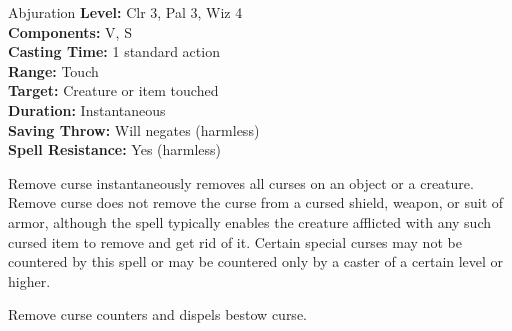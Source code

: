 {Abjuration}
{
	\textbf{Level:}
	Clr 3, Pal 3, Wiz 4\\
	\textbf{Components:}
	V, S\\
	\textbf{Casting Time:}
	1 standard action\\
	\textbf{Range:}
	Touch\\
	\textbf{Target:}
	Creature or item touched\\
	\textbf{Duration:}
	Instantaneous\\
	\textbf{Saving Throw:}
	Will negates (harmless)\\
	\textbf{Spell Resistance:}
	Yes (harmless)\\
}
{
	Remove curse instantaneously removes all curses on an object or a creature. Remove curse does not remove the curse from a cursed shield, weapon, or suit of armor, although the spell typically enables the creature afflicted with any such cursed item to remove and get rid of it. Certain special curses may not be countered by this spell or may be countered only by a caster of a certain level or higher.

	Remove curse counters and dispels bestow curse.

}
